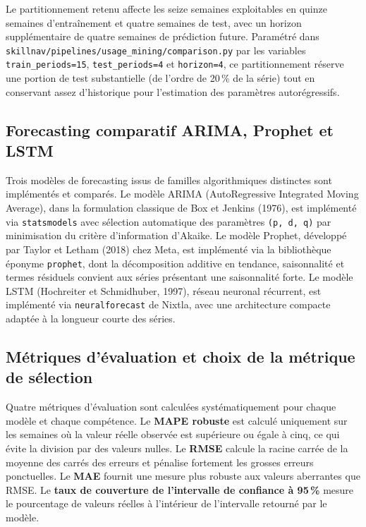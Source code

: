 \documentclass[11pt,a4paper,openany]{report}
\begin{document}
Le partitionnement retenu affecte les seize semaines exploitables en quinze semaines d'entra\^inement et quatre semaines de test, avec un horizon suppl\'ementaire de quatre semaines de pr\'ediction future. Param\'etr\'e dans \texttt{skillnav/pipelines/usage\_mining/comparison.py} par les variables \texttt{train\_periods=15}, \texttt{test\_periods=4} et \texttt{horizon=4}, ce partitionnement r\'eserve une portion de test substantielle (de l'ordre de 20\,\% de la s\'erie) tout en conservant assez d'historique pour l'estimation des param\`etres autor\'egressifs.

\subsection{Forecasting comparatif ARIMA, Prophet et LSTM}

Trois mod\`eles de forecasting issus de familles algorithmiques distinctes sont impl\'ement\'es et compar\'es. Le mod\`ele ARIMA (AutoRegressive Integrated Moving Average), dans la formulation classique de Box et Jenkins (1976), est impl\'ement\'e via \texttt{statsmodels} avec s\'election automatique des param\`etres \texttt{(p, d, q)} par minimisation du crit\`ere d'information d'Akaike. Le mod\`ele Prophet, d\'evelopp\'e par Taylor et Letham (2018) chez Meta, est impl\'ement\'e via la biblioth\`eque \'eponyme \texttt{prophet}, dont la d\'ecomposition additive en tendance, saisonnalit\'e et termes r\'esiduels convient aux s\'eries pr\'esentant une saisonnalit\'e forte. Le mod\`ele LSTM (Hochreiter et Schmidhuber, 1997), r\'eseau neuronal r\'ecurrent, est impl\'ement\'e via \texttt{neuralforecast} de Nixtla, avec une architecture compacte adapt\'ee \`a la longueur courte des s\'eries.

\subsection{M\'etriques d'\'evaluation et choix de la m\'etrique de s\'election}

Quatre m\'etriques d'\'evaluation sont calcul\'ees syst\'ematiquement pour chaque mod\`ele et chaque comp\'etence. Le \textbf{MAPE robuste} est calcul\'e uniquement sur les semaines o\`u la valeur r\'eelle observ\'ee est sup\'erieure ou \'egale \`a cinq, ce qui \'evite la division par des valeurs nulles. Le \textbf{RMSE} calcule la racine carr\'ee de la moyenne des carr\'es des erreurs et p\'enalise fortement les grosses erreurs ponctuelles. Le \textbf{MAE} fournit une mesure plus robuste aux valeurs aberrantes que RMSE. Le \textbf{taux de couverture de l'intervalle de confiance \`a 95\,\%} mesure le pourcentage de valeurs r\'eelles \`a l'int\'erieur de l'intervalle retourn\'e par le mod\`ele.
\end{document}
